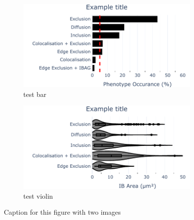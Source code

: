 \begin{figure}[h]

    \begin{subfigure}{0.5\textwidth}
    \includegraphics[width=1\linewidth]{09. Chapter 4/Figs/test-bar.pdf} 
    \caption{test bar}
    \label{fig:subim1}
    \end{subfigure}
    \begin{subfigure}{0.5\textwidth}
    \includegraphics[width=1\linewidth]{09. Chapter 4/Figs/test-violin.pdf}
    \caption{test violin}
    \label{fig:subim2}
    \end{subfigure}
    
    \caption{Caption for this figure with two images}
    \label{fig:image2}
    \end{figure}



